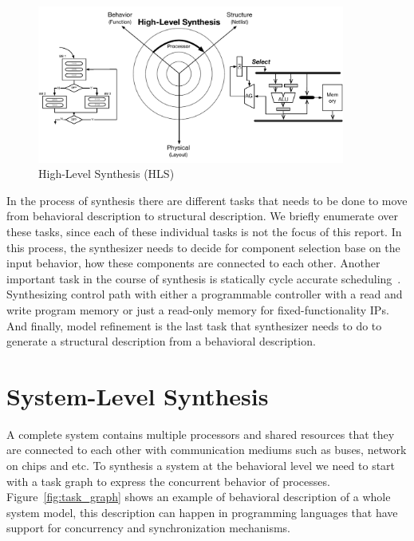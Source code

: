 \begin{figure}[h]
    \centering
    \includegraphics[width=0.9\textwidth]{figures/Introduction/processor-synthesis.pdf}
    \caption{High-Level Synthesis (HLS)}
    \label{fig:proc_synthesis}
\end{figure}

In the process of synthesis there are different tasks that needs to be done to move from behavioral description to structural description.
We briefly enumerate over these tasks, since each of these individual tasks is not the focus of this report.
In this process, the synthesizer needs to decide for component selection base on the input behavior, how these components are connected to each other.
Another important task in the course of synthesis is statically cycle accurate scheduling~\cite{canis_2014_modulo,cong_2009_scheduling,cong_2008_scheduling, cong_2006_efficient}.
Synthesizing control path with either a programmable controller with a read and write program memory or just a read-only memory for fixed-functionality IPs.
And finally, model refinement is the last task that synthesizer needs to do to generate a structural description from a behavioral description.


\section{System-Level Synthesis}

A complete system contains multiple processors and shared resources that they are connected to each other with communication mediums such as buses, network on chips and etc.
To synthesis a system at the behavioral level we need to start with a task graph to express the concurrent behavior of processes.
Figure~\ref{fig:task_graph} shows an example of behavioral description of a whole system model, this description can happen in programming languages that have support for concurrency and synchronization mechanisms.

